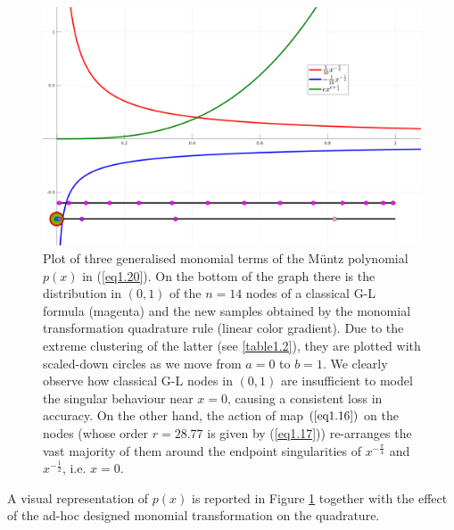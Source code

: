 \documentclass[a4paper, twosided]{book}
\begin{document}
\begin{center}
        \begin{figure}[h]
        \captionsetup{singlelinecheck=off}
        \includegraphics[keepaspectratio,width=\textwidth]{images/GenPolyMonMap.png}
        \caption{Plot of three generalised monomial terms of the Müntz polynomial $p(x)$ in (\ref{eq1.20}). On the bottom of the graph there is the distribution in $(0,1)$ of the $n=14$ nodes of a classical G-L formula (magenta) and the new samples obtained by the monomial transformation quadrature rule (linear color gradient). Due to the extreme clustering of the latter (see \ref{table1.2}), they are plotted with scaled-down circles as we move from $a=0$ to $b=1$. We clearly observe how classical G-L nodes in $(0,1)$ are insufficient to model the singular behaviour near $x=0$, causing a consistent loss in accuracy. On the other hand, the action of map $(\ref{eq1.16})$ on the nodes (whose order $r=28.77$ is given by (\ref{eq1.17})) re-arranges the vast majority of them around the endpoint singularities of $x^{-\frac{\pi}{4}}$ and $x^{-\frac{1}{2}}$, i.e. $x=0$.}
        \label{Fig1.2}
        \end{figure}
\end{center}

\vspace{-1.25cm}
\noindent
A visual representation of $p(x)$ is reported in Figure \ref{Fig1.2} together with the effect of the ad-hoc designed monomial transformation on the quadrature.
\end{document}
